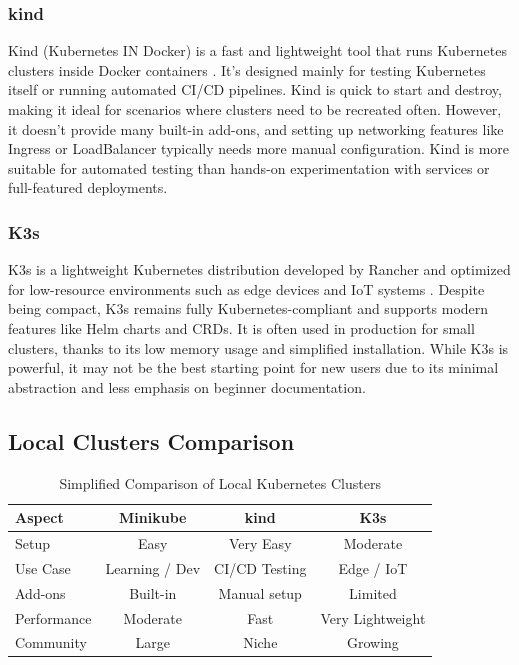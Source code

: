 \subsubsection{kind}
Kind (Kubernetes IN Docker) is a fast and lightweight tool that runs Kubernetes clusters inside Docker containers \cite{kind-docs}. It's designed mainly for testing Kubernetes itself or running automated CI/CD pipelines. Kind is quick to start and destroy, making it ideal for scenarios where clusters need to be recreated often. However, it doesn't provide many built-in add-ons, and setting up networking features like Ingress or LoadBalancer typically needs more manual configuration. Kind is more suitable for automated testing than hands-on experimentation with services or full-featured deployments.

\subsubsection{K3s}
K3s is a lightweight Kubernetes distribution developed by Rancher and optimized for low-resource environments such as edge devices and IoT systems \cite{k3s-docs}. Despite being compact, K3s remains fully Kubernetes-compliant and supports modern features like Helm charts and CRDs. It is often used in production for small clusters, thanks to its low memory usage and simplified installation. While K3s is powerful, it may not be the best starting point for new users due to its minimal abstraction and less emphasis on beginner documentation.

\subsection{Local Clusters Comparison}
\begin{table}[h]
\centering
\begin{tabular}{|l|c|c|c|}
\hline
\textbf{Aspect} & \textbf{Minikube} & \textbf{kind} & \textbf{K3s} \\
\hline
Setup & Easy & Very Easy & Moderate \\
Use Case & Learning / Dev & CI/CD Testing & Edge / IoT \\
Add-ons & Built-in & Manual setup & Limited \\
Performance & Moderate & Fast & Very Lightweight \\
Community & Large & Niche & Growing \\
\hline
\end{tabular}
\caption{Simplified Comparison of Local Kubernetes Clusters}
\end{table}


